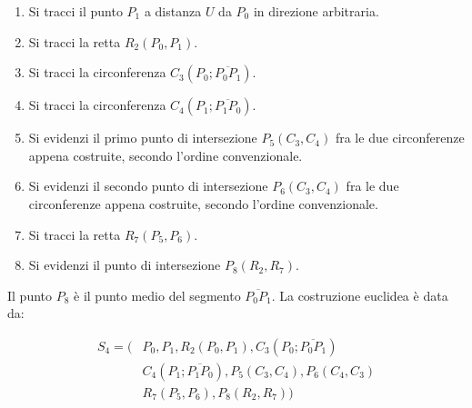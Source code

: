 \begin{enumerate}

\item Si tracci il punto $P_{1}$ a distanza $U$ da $P_{0}$ in direzione arbitraria.

\item Si tracci la retta $R_{2}(P_{0}, P_{1})$.

\item Si tracci la circonferenza $C_{3}(P_{0}; \overline{P_{0} P_{1}})$.

\item Si tracci la circonferenza $C_{4}(P_{1}; \overline{P_{1} P_{0}})$.

\item Si evidenzi il primo punto di intersezione $P_{5}(C_{3},C_{4})$ fra le due circonferenze appena costruite, secondo l'ordine convenzionale.

\item Si evidenzi il secondo punto di intersezione  $P_{6}(C_{3},C_{4})$ fra le due circonferenze appena costruite, secondo l'ordine convenzionale.

\item Si tracci la retta $R_{7}(P_{5}, P_{6})$.

\item Si evidenzi il punto di intersezione $P_{8}(R_{2},R_{7})$.

\end{enumerate}

\noindent
Il punto  $P_{8}$ è il punto medio del segmento $ \overline{P_{0} P_{1}}$.
La costruzione euclidea è data da:


\begin{align*}
S_{4} = (&P_{0}, P_{1}, R_{2}(P_{0}, P_{1}), C_{3}(P_{0}; \overline{P_{0} P_{1}}) \\
&C_{4}(P_{1}; \overline{P_{1} P_{0}}), P_{5}(C_{3},C_{4}), P_{6}(C_{4},C_{3}) \\
&R_{7}(P_{5}, P_{6}), P_{8}(R_{2},R_{7}) )
\end{align*}




